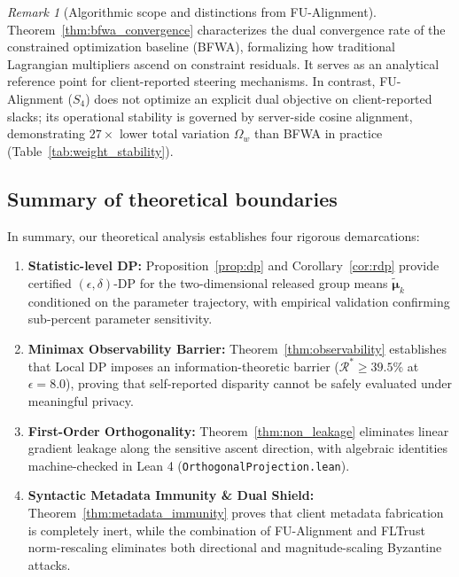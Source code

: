 \documentclass[preprint,12pt]{elsarticle}
\theoremstyle{plain}
\theoremstyle{definition}
\theoremstyle{remark}
\newtheorem{remark}{Remark}
\begin{document}
\begin{remark}[Algorithmic scope and distinctions from FU-Alignment]
\label{rem:bfwa_scope}
Theorem~\ref{thm:bfwa_convergence} characterizes the dual convergence rate of the constrained optimization baseline (BFWA), formalizing how traditional Lagrangian multipliers ascend on constraint residuals. It serves as an analytical reference point for client-reported steering mechanisms. In contrast, FU-Alignment ($S_4$) does not optimize an explicit dual objective on client-reported slacks; its operational stability is governed by server-side cosine alignment, demonstrating $27\times$ lower total variation $\Omega_w$ than BFWA in practice (Table~\ref{tab:weight_stability}).
\end{remark}

\subsection{Summary of theoretical boundaries}
\label{sec:theory_summary}
In summary, our theoretical analysis establishes four rigorous demarcations:
\begin{enumerate}
    \item \textbf{Statistic-level DP:} Proposition~\ref{prop:dp} and Corollary~\ref{cor:rdp} provide certified $(\epsilon,\delta)$-DP for the two-dimensional released group means $\tilde{\bm{\mu}}_k$ conditioned on the parameter trajectory, with empirical validation confirming sub-percent parameter sensitivity.
    \item \textbf{Minimax Observability Barrier:} Theorem~\ref{thm:observability} establishes that Local DP imposes an information-theoretic barrier ($\mathcal{R}^* \ge 39.5\%$ at $\epsilon=8.0$), proving that self-reported disparity cannot be safely evaluated under meaningful privacy.
    \item \textbf{First-Order Orthogonality:} Theorem~\ref{thm:non_leakage} eliminates linear gradient leakage along the sensitive ascent direction, with algebraic identities machine-checked in Lean 4 (\texttt{OrthogonalProjection.lean}).
    \item \textbf{Syntactic Metadata Immunity \& Dual Shield:} Theorem~\ref{thm:metadata_immunity} proves that client metadata fabrication is completely inert, while the combination of FU-Alignment and FLTrust norm-rescaling eliminates both directional and magnitude-scaling Byzantine attacks.
\end{enumerate}

\end{document}

